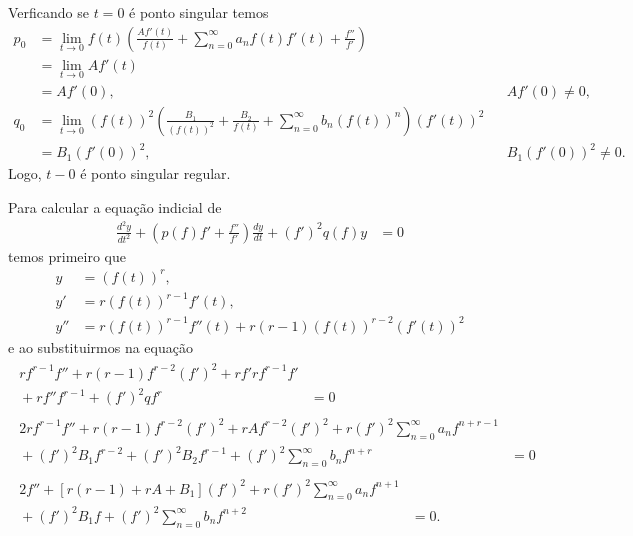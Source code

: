 \documentclass[a4paper,12pt, leqno, answers]{exam}
\begin{document}
\begin{questions}
\begin{solution}
        Verficando se $t = 0$ \'{e} ponto singular temos
        \begin{align*}
            p_0 &= \lim_{t \to 0} f(t) \left( \frac{A f'(t)}{f(t)} + \sum_{n = 0}^\infty a_n f(t) f'(t) + \frac{f''}{f'} \right) \\
            &= \lim_{t \to 0} A f'(t) \\
            &= A f'(0), && A f'(0) \neq 0, \\
            q_0&= \lim_{t \to 0} \left( f(t) \right)^2 \left( \frac{B_1}{\left( f(t) \right)^2} + \frac{B_2}{f(t)} + \sum_{n = 0}^\infty b_n \left( f(t) \right)^n \right) \left( f'(t) \right)^2 \\
            &= B_1 \left( f'(0) \right)^2, && B_1 \left( f'(0) \right)^2 \neq 0.
        \end{align*}
        Logo, $t - 0$ \'{e} ponto singular regular.

        Para calcular a equa\c{c}\~{a}o indicial de
        \begin{align*}
            \frac{d^2 y}{d t^2} + \left( p(f) f' + \frac{f''}{f'} \right) \frac{d y}{d t} + \left( f' \right)^2 q(f) y &= 0
        \end{align*}
        temos primeiro que
        \begin{align*}
            y &= \left( f(t) \right)^r, \\
            y' &= r \left( f(t) \right)^{r -1} f'(t), \\
            y'' &= r\left( f(t) \right)^{r - 1} f''(t) + r \left( r - 1 \right) \left( f(t) \right)^{r - 2} \left( f'(t) \right)^2
        \end{align*}
        e ao substituirmos na equa\c{c}\~{a}o
        \begin{align*}
            \begin{split}
                r f^{r - 1} f'' + r \left( r - 1 \right) f^{r - 2} \left( f' \right)^2 + r f' r f^{r - 1} f' \\ {}+ r f'' f^{r - 1} + \left( f' \right)^2 q f^r &= 0
            \end{split} \\
            \begin{split}
                2 r f^{r - 1} f'' + r \left( r - 1 \right) f^{r - 2} \left( f' \right)^2 + r A f^{r - 2} \left( f' \right)^2 + r \left( f' \right)^2 \sum_{n = 0}^\infty a_n f^{n + r -1} \\ {}+ \left( f' \right)^2 B_1 f^{r -2} + \left( f' \right)^2 B_2 f^{r - 1} + \left( f' \right)^2 \sum_{n = 0}^\infty b_n f^{n + r} &= 0
            \end{split} \\
            \begin{split}
                2f''+ \left[ r \left( r - 1 \right) + r A + B_1 \right] \left( f' \right)^2 + r \left( f' \right)^2 \sum_{n = 0}^\infty a_n f^{n + 1} \\ {}+ \left( f' \right)^2 B_1 f + \left( f' \right)^2 \sum_{n = 0}^\infty b_n f^{n + 2} &= 0.
            \end{split}
        \end{align*}


\end{solution}
\end{questions}
\end{document}
